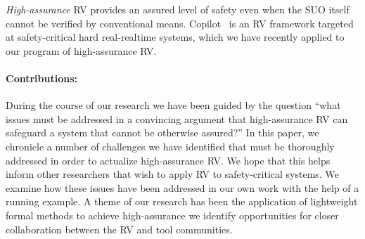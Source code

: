 \emph{High-assurance} RV provides an assured level of safety even when
the SUO itself cannot be verified  by conventional
means. Copilot~\cite{copilot, pike-isse-13} is an RV framework
targeted at safety-critical hard real-realtime systems, which we have
recently applied to our program of high-assurance RV.  


\paragraph{Contributions:} During the course of our research we have
been guided by the question ``what
 issues must be  addressed in a convincing argument  that  high-assurance RV can safeguard a
system that cannot be otherwise assured?''  In this paper, we
chronicle a number of  challenges we have identified that must be
thoroughly addressed in order to actualize high-assurance RV.  We hope
that this helps inform other researchers that wish to apply RV to
safety-critical systems. We examine  how  these issues have been
addressed in our own work   with the help of a running example. A
theme of our research has been the 
application of lightweight formal methods to achieve
high-assurance  we identify opportunities for closer collaboration
between the RV and tool communities.   



